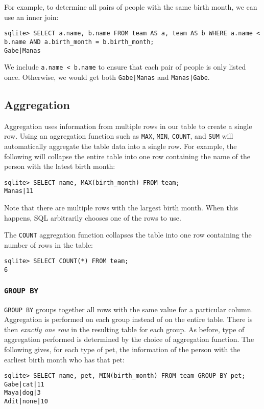 For example, to determine all pairs of people with the same birth month, we can use an inner join: 
\begin{lstlisting}
sqlite> SELECT a.name, b.name FROM team AS a, team AS b WHERE a.name < b.name AND a.birth_month = b.birth_month;
Gabe|Manas
\end{lstlisting}

\begin{meta}
We include \lstinline{a.name < b.name} to ensure that each pair of people is only listed once. Otherwise, we would get both \lstinline{Gabe|Manas} and \lstinline{Manas|Gabe}. 
\end{meta}

\subsection{Aggregation}
Aggregation uses information from multiple rows in our table to create a single row. Using an aggregation function such as \lstinline{MAX}, \lstinline{MIN}, \lstinline{COUNT}, and \lstinline{SUM} will automatically aggregate the table data into a single row. For example, the following will collapse the entire table into one row containing the name of the person with the latest birth month: 
\begin{lstlisting}
sqlite> SELECT name, MAX(birth_month) FROM team; 
Manas|11
\end{lstlisting}

Note that there are multiple rows with the largest birth month. When this happens, SQL arbitrarily chooses one of the rows to use. 

The \lstinline{COUNT} aggregation function collapses the table into one row containing the number of rows in the table: 
\begin{lstlisting}
sqlite> SELECT COUNT(*) FROM team; 
6
\end{lstlisting}

\subsubsection{\lstinline{GROUP BY}}
\lstinline{GROUP BY} groups together all rows with the same value for a particular column. Aggregation is performed on each group instead of on the entire table. There is then \textit{exactly one row} in the resulting table for each group. As before, type of aggregation performed is determined by the choice of aggregation function. The following gives, for each type of pet, the information of the person with the earliest birth month who has that pet: 
\begin{lstlisting}
sqlite> SELECT name, pet, MIN(birth_month) FROM team GROUP BY pet; 
Gabe|cat|11
Maya|dog|3
Adit|none|10
\end{lstlisting}


